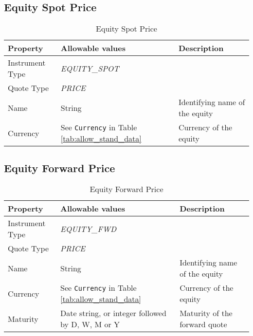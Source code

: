 \subsection{Equity Spot Price}

\begin{table}[H]
    \centering
    \begin{tabular}{|p{3cm}|p{3.5cm}|p{7cm}|}
        \hline
        {\bf Property} & {\bf Allowable values} & {\bf Description} \\ \hline
        Instrument Type & \emph{EQUITY\_SPOT} & \\ \hline
        Quote Type & \emph{PRICE} & \\ \hline
        Name & String & Identifying name of the equity \\ \hline
        Currency & See \lstinline!Currency! in Table \ref{tab:allow_stand_data}&  Currency of the equity \\ \hline
    \end{tabular}
    \caption{Equity Spot Price}
    \label{tab:eqspot_quote}
\end{table}

\subsection{Equity Forward Price}

\begin{table}[H]
    \centering
    \begin{tabular}{|p{3cm}|p{3.5cm}|p{7cm}|}
        \hline
        {\bf Property} & {\bf Allowable values} & {\bf Description} \\ \hline
        Instrument Type & \emph{EQUITY\_FWD} & \\ \hline
        Quote Type & \emph{PRICE} & \\ \hline
        Name & String & Identifying name of the equity \\ \hline
        Currency & See \lstinline!Currency! in Table \ref{tab:allow_stand_data}&  Currency of the equity \\ \hline
        Maturity & Date string, or integer followed by D, W, M or Y & Maturity of the forward quote \\ \hline
    \end{tabular}
    \caption{Equity Forward Price}
    \label{tab:eqfwd_quote}
\end{table}


